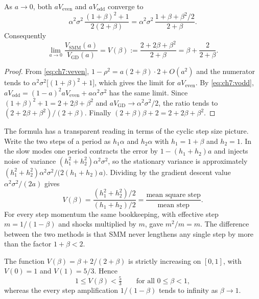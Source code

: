 \begin{corollary}\label{cor:ch7:slow}
As $a\to0$, both $aV_{\mathrm{even}}$ and $aV_{\mathrm{odd}}$ converge to
\[
  \alpha^2\sigma^2\,\frac{(1+\beta)^2+1}{2(2+\beta)}
  =\alpha^2\sigma^2\,\frac{1+\beta+\beta^2/2}{2+\beta}.
\]
Consequently
\begin{equation}\label{eq:ch7:V}
  \lim_{a\to0}\frac{V_{\mathrm{SMM}}(a)}{V_{\mathrm{GD}}(a)}
  =V(\beta):=\frac{2+2\beta+\beta^2}{2+\beta}=\beta+\frac{2}{2+\beta}.
\end{equation}
\end{corollary}

\begin{proof}
From \eqref{eq:ch7:veven}, $1-\rho^2=a(2+\beta)\cdot2+O(a^2)$ and the
numerator tends to $\alpha^2\sigma^2\bigl[(1+\beta)^2+1\bigr]$, which gives the
limit for $aV_{\mathrm{even}}$. By \eqref{eq:ch7:vodd},
$aV_{\mathrm{odd}}=(1-a)^2aV_{\mathrm{even}}+a\alpha^2\sigma^2$ has the same limit.
Since $(1+\beta)^2+1=2+2\beta+\beta^2$ and $aV_{\mathrm{GD}}\to\alpha^2\sigma^2/2$,
the ratio tends to $(2+2\beta+\beta^2)/(2+\beta)$. Finally
$(2+\beta)\beta+2=2+2\beta+\beta^2$.
\end{proof}

The formula has a transparent reading in terms of the cyclic step size picture.
Write the two steps of a period as $h_1\alpha$ and $h_2\alpha$ with
$h_1=1+\beta$ and $h_2=1$. In the slow modes one period contracts the error by
$1-(h_1+h_2)a$ and injects noise of variance $(h_1^2+h_2^2)\alpha^2\sigma^2$, so
the stationary variance is approximately
$(h_1^2+h_2^2)\alpha^2\sigma^2/\bigl(2(h_1+h_2)a\bigr)$. Dividing by the gradient
descent value $\alpha^2\sigma^2/(2a)$ gives
\begin{equation}\label{eq:ch7:Vh}
  V(\beta)=\frac{(h_1^2+h_2^2)/2}{(h_1+h_2)/2}
  =\frac{\text{mean square step}}{\text{mean step}} .
\end{equation}
For every step momentum the same bookkeeping, with effective step $m=1/(1-\beta)$
and shocks multiplied by $m$, gave $m^2/m=m$. The difference between the two
methods is that SMM never lengthens any single step by more than the factor
$1+\beta<2$.

\begin{proposition}\label{prop:ch7:bound}
The function $V(\beta)=\beta+2/(2+\beta)$ is strictly increasing on $[0,1]$,
with $V(0)=1$ and $V(1)=5/3$. Hence
\[
  1\le V(\beta)<\tfrac53\qquad\text{for all }0\le\beta<1,
\]
whereas the every step amplification $1/(1-\beta)$ tends to infinity as
$\beta\to1$.
\end{proposition}

